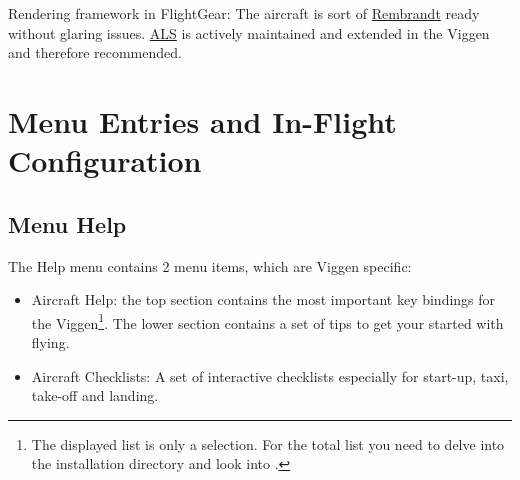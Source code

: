 Rendering framework in FlightGear: The aircraft is sort of \href{http://wiki.flightgear.org/Project_Rembrandt}{Rembrandt} ready without glaring issues. \href{http://wiki.flightgear.org/Atmospheric_light_scattering}{ALS} is actively maintained and extended in the Viggen and therefore recommended.

\section{Menu Entries and In-Flight Configuration}
\subsection{Menu Help}
The Help menu contains 2 menu items, which are Viggen specific:
\begin{itemize}
\item Aircraft Help: the top section contains the most important key bindings for the Viggen\footnote{The displayed list is only a selection. For the total list you need to delve into the installation directory and look into .}. The lower section contains a set of tips to get your started with flying.
\item Aircraft Checklists: A set of interactive checklists especially for start-up, taxi, take-off and landing.
\end{itemize}

